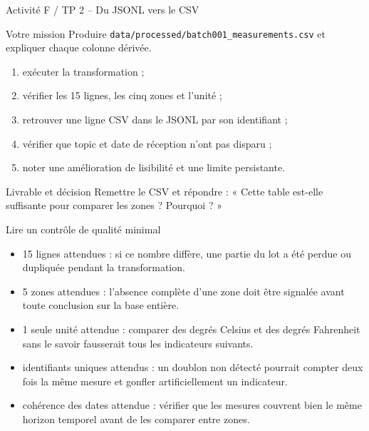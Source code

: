 \documentclass[aspectratio=169]{beamer}
\begin{document}
\begin{frame}{Activité F / TP 2 -- Du JSONL vers le CSV}
  \begin{block}{Votre mission}
    Produire \texttt{data/processed/batch001\_measurements.csv} et expliquer chaque colonne dérivée.
  \end{block}
  \begin{enumerate}
    \item exécuter la transformation ;
    \item vérifier les 15 lignes, les cinq zones et l'unité ;
    \item retrouver une ligne CSV dans le JSONL par son identifiant ;
    \item vérifier que topic et date de réception n'ont pas disparu ;
    \item noter une amélioration de lisibilité et une limite persistante.
  \end{enumerate}
  \begin{block}{Livrable et décision}
    Remettre le CSV et répondre : « Cette table est-elle suffisante pour comparer les zones ? Pourquoi ? »
  \end{block}
\end{frame}

\begin{frame}{Lire un contrôle de qualité minimal}
  \begin{itemize}
    \item 15 lignes attendues : si ce nombre diffère, une partie du lot a été perdue ou dupliquée pendant la transformation.
    \item 5 zones attendues : l'absence complète d'une zone doit être signalée avant toute conclusion sur la base entière.
    \item 1 seule unité attendue : comparer des degrés Celsius et des degrés Fahrenheit sans le savoir fausserait tous les indicateurs suivants.
    \item identifiants uniques attendus : un doublon non détecté pourrait compter deux fois la même mesure et gonfler artificiellement un indicateur.
    \item cohérence des dates attendue : vérifier que les mesures couvrent bien le même horizon temporel avant de les comparer entre zones.
  \end{itemize}
\end{frame}
\end{document}
